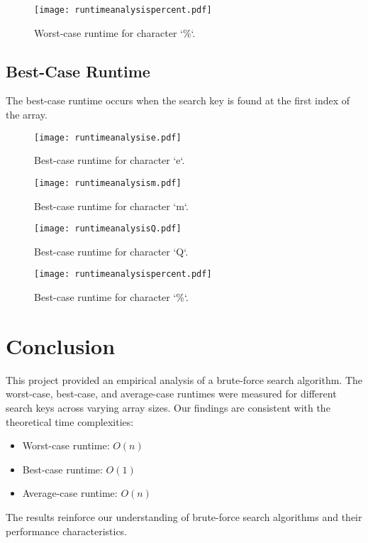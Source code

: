 \documentclass{article}
\begin{document}
	\begin{figure}[H]
		\centering
		\texttt{[image: runtimeanalysispercent.pdf]}
		\caption{Worst-case runtime for character `\%`.}
	\end{figure}
	
\subsection{Best-Case Runtime}
The best-case runtime occurs when the search key is found at the first index of the array.
	
	\begin{figure}[H]
		\centering
		\texttt{[image: runtimeanalysise.pdf]}
		\caption{Best-case runtime for character `e`.}
	\end{figure}
	
	\begin{figure}[H]
		\centering
		\texttt{[image: runtimeanalysism.pdf]}
		\caption{Best-case runtime for character `m`.}
	\end{figure}
	
	\begin{figure}[H]
		\centering
		\texttt{[image: runtimeanalysisQ.pdf]}
		\caption{Best-case runtime for character `Q`.}
	\end{figure}
	
	\begin{figure}[H]
		\centering
		\texttt{[image: runtimeanalysispercent.pdf]}
		\caption{Best-case runtime for character `\%`.}
	\end{figure}
	
\section{Conclusion}
This project provided an empirical analysis of a brute-force search algorithm. The worst-case, best-case, and average-case runtimes were measured for different search keys across varying array sizes. Our findings are consistent with the theoretical time complexities:
	
    \begin{itemize}
        \item Worst-case runtime: \( O(n) \)
	\item Best-case runtime: \( O(1) \)
	\item Average-case runtime: \( O(n) \)
    \end{itemize}
The results reinforce our understanding of brute-force search algorithms and their performance characteristics.
\end{document}
